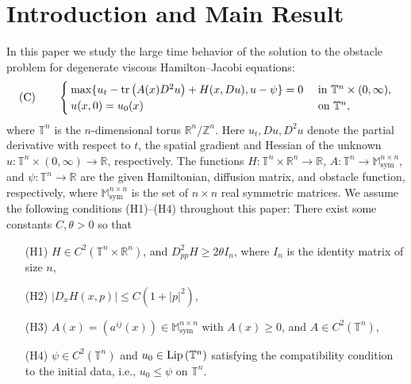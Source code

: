 \documentclass[12pt,reqno]{amsart}
\theoremstyle{plain}
\theoremstyle{remark}
\numberwithin{equation}{section}
\begin{document}
\section{Introduction and Main Result}
In this paper we study the large time behavior of the solution to the obstacle problem for degenerate viscous Hamilton--Jacobi equations: 
\begin{equation} \notag
{\rm (C)} \qquad 
\begin{cases}
\max\{u_t -{{\rm tr}\,}\big(A(x)D^2u\big) + H(x,Du), u-\psi\}=0 & \text{ in } {\mathbb{T}^{n}\times(0,\infty)}, \\
u(x,0)=u_{0}(x) & \text{ on } {\mathbb{T}}^n,
\end{cases}
\end{equation}
where ${\mathbb{T}}^n$ is the $n$-dimensional torus ${\mathbb{R}}^n / {\mathbb{Z}}^n$.
Here $u_t, Du, D^2u$ denote the partial derivative with respect to $t$, 
the spatial gradient and Hessian of the unknown
$u:{\mathbb{T}^{n}\times(0,\infty)} \to {\mathbb{R}}$, respectively.  
The functions $H:{\mathbb{T}}^n \times {\mathbb{R}}^n \to {\mathbb{R}}$, 
$A:{\mathbb{T}}^n \to {\mathbb{M}}^{n\times n}_{\text{sym}}$, and $\psi:{\mathbb{T}}^n\to{\mathbb{R}}$ 
are the given Hamiltonian, diffusion matrix, and obstacle function,  respectively, where ${\mathbb{M}}^{n\times n}_{\text{sym}}$ is the set of $n\times n$
real symmetric matrices. 
We assume the following conditions (H1)--(H4) throughout this paper:  
There exist some constants $C,\theta>0$ so that
\begin{itemize}
\item[(H1)] $H \in C^2({\mathbb{T}}^n \times {\mathbb{R}}^n)$, and 
$D^2_{pp}H \ge 2\theta I_n$, where $I_n$ is the identity matrix of size $n$, 
\item[(H2)] 
$|D_x H(x,p)| \le C(1+|p|^2)$,  
\item[{(H3)}] 
$A(x)=(a^{ij}(x))\in {\mathbb{M}}^{n\times n}_{\text{sym}}$ with $A(x)\ge 0$,  and $A\in C^2({\mathbb{T}}^n)$, 
\item[{(H4)}] 
$\psi\in C^2({\mathbb{T}}^n)$ and $u_0 \in {{\rm Lip\,}}({\mathbb{T}}^n)$ satisfying the compatibility condition to the initial data, i.e., $u_0 \leq \psi$ on ${\mathbb{T}}^n$.
\end{itemize}
\smallskip
\end{document}
